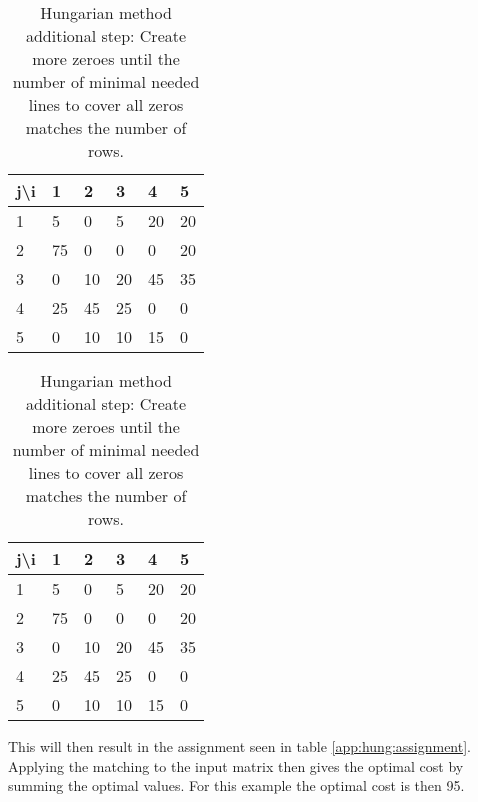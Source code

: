 \begin{table}[h]
    \centering
    \begin{tabular}{|l | l l l l l |}
    \hline
    j\textbackslash i & 1 & 2 & 3 & 4 & 5\\ \hline
    1 & 5 & 0 & 5 & 20 & 20\\
    2 & 75 & 0 & 0 & 0 & 20\\
    3 & 0 & 10 & 20 & 45 & 35\\
    4 & 25 & 45 & 25 & 0 & 0\\
    5 & 0 & 10 & 10 & 15 & 0\\ \hline
    \end{tabular}
    \begin{tabular}{|l | l l l l l |}
        \hline
        j\textbackslash i & 1 & 2 & 3 & 4 & 5\\ \hline
        1 & \cellcolor{orange!25}5 & \cellcolor{orange!50}0 & 5 & 20 & 20\\
        2 & \cellcolor{orange!75}75 & \cellcolor{orange!75}0 & \cellcolor{orange!75}0 & \cellcolor{orange!75}0 & \cellcolor{orange!75}20\\
        3 & \cellcolor{orange!25}0 & \cellcolor{orange!50}10 & 20 & 45 & 35\\
        4 & \cellcolor{orange!75}25 & \cellcolor{orange!75}45 & \cellcolor{orange!75}25 & \cellcolor{orange!75}0 & \cellcolor{orange!75}0\\
        5 & \cellcolor{orange!100}0 & \cellcolor{orange!100}10 & \cellcolor{orange!100}10 & \cellcolor{orange!100}15 & \cellcolor{orange!100}0\\ \hline
    \end{tabular}
    \caption{Hungarian method additional step: Create more zeroes until the number of minimal needed lines to cover all zeros matches the number of rows.}
    \label{app:hung:additionalstep}
\end{table}

This will then result in the assignment seen in table \ref{app:hung:assignment}. Applying the matching to the input matrix then gives the optimal cost by summing the optimal values. For this example the optimal cost is then 95.

